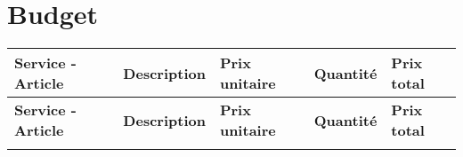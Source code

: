 \chapter{Budget}

\begin{longtable}{ >{\centering\arraybackslash\bfseries}m{} >{\raggedright\arraybackslash}m{} >{\raggedright\arraybackslash}m{} >{\raggedright\arraybackslash}m{} >{\raggedright\arraybackslash}m{}}

        \hline
        \hline
        \rowcolor{TetTablo}
        \textbf{\large Service - Article} & \textbf{Description} & \textbf{Prix unitaire} & \textbf{Quantit\'e} & \textbf{Prix total}\\
        \hline
        \hline
        \endfirsthead

        \hline
        \hline
        \rowcolor{TetTablo}
        \textbf{\large Service - Article} & \textbf{Description} & \textbf{Prix unitaire} & \textbf{Quantit\'e} & \textbf{Prix total}\\
        \hline
        \hline
        \endhead

        \hline
        \endfoot

        \hline
        \hline
        \endlastfoot

        
		\rowcolor{mybrown}
		\multicolumn{5}{l}{\bfseries Mat\'eriel} \\
    \end{longtable}